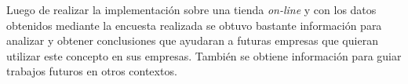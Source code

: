 Luego de realizar la implementación {\GAM} sobre una tienda \emph{on-line} y con los datos
obtenidos mediante la encuesta realizada se obtuvo bastante información para
analizar y obtener conclusiones que ayudaran a futuras empresas que quieran
utilizar este concepto en sus empresas. También se obtiene información para guiar
trabajos futuros en otros contextos.
